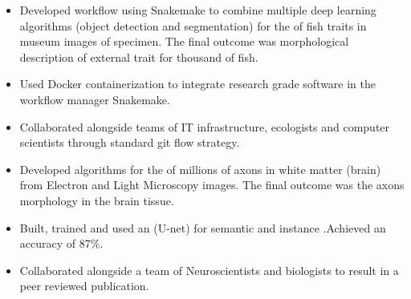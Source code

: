 \documentclass[10pt,a4paper,ragged2e,withhyper]{altacv}
\begin{document}
\begin{paracol}{2}
        
        \newpage
        
        
        \switchcolumn

        
            \begin{itemize}
                \item Developed workflow using Snakemake to combine multiple deep learning algorithms (object detection and segmentation) for the  of fish traits in museum images of specimen. The final outcome was morphological description of external trait for thousand of fish.
                \item Used Docker containerization to integrate research grade software in the workflow manager Snakemake.
                \item Collaborated alongside teams of IT infrastructure, ecologists and computer scientists through standard git flow strategy.
            \end{itemize}
            \divider        
            \begin{itemize}
                \item Developed algorithms for the  of millions of axons in white matter (brain) from Electron and Light Microscopy images. The final outcome was the axons morphology in the brain tissue.
                \item Built, trained and used an  (U-net) for semantic and instance .Achieved an  accuracy of 87\%.
                \item Collaborated alongside a team of
                Neuroscientists and biologists to result in a peer reviewed publication.
            \end{itemize}
            \divider
            

\end{paracol}
\end{document}
